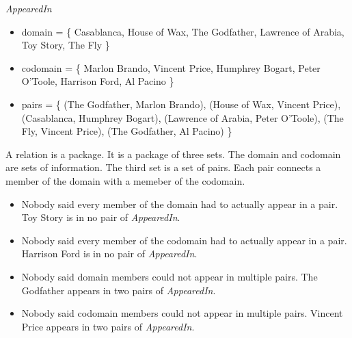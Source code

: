 \documentclass{ximera}
\begin{document}
\begin{example} \textit{AppearedIn}
\begin{itemize}
\item domain = \{ Casablanca, House of Wax,  The Godfather, Lawrence of Arabia, Toy Story, The Fly \}  
\item codomain = \{ Marlon Brando, Vincent Price, Humphrey Bogart, Peter O'Toole, Harrison Ford, Al Pacino  \} 
\item pairs = \{ (The Godfather, Marlon Brando), (House of Wax, Vincent Price), (Casablanca, Humphrey Bogart), (Lawrence of Arabia, Peter O'Toole), (The Fly, Vincent Price), (The Godfather, Al Pacino) \} 
\end{itemize}
\end{example}

A relation is a package.  It is a package of three sets. The domain and codomain are sets of information.  The third set is a set of pairs.  Each pair connects a member of the domain with a memeber of the codomain. \\

\begin{observation}
\begin{itemize}
\item Nobody said every member of the domain had to actually appear in a pair.  Toy Story is in no pair of \textit{AppearedIn}.
\item Nobody said every member of the codomain had to actually appear in a pair.  Harrison Ford is in no pair of \textit{AppearedIn}.
\item Nobody said domain members could not appear in multiple pairs.  The Godfather appears in two pairs of \textit{AppearedIn}.
\item Nobody said codomain members could not appear in multiple pairs.  Vincent Price appears in two pairs of \textit{AppearedIn}.
\end{itemize}
\end{observation}
\end{document}
